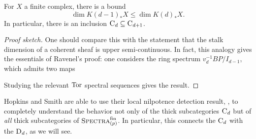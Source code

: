 \begin{lemma}\label{CdCategoriesNest}
For \(X\) a finite complex, there is a bound \[\dim K(d-1)_* X \le \dim K(d)_* X.\]  In particular, there is an inclusion \(\normalfont\textsc{C}_d \subseteq \normalfont\textsc{C}_{d+1}\).
\end{lemma}
\begin{proof}[Proof sketch]
One should compare this with the statement that the stalk dimension of a coherent sheaf is upper semi-continuous.  In fact, this analogy gives the essentials of Ravenel's proof: one considers the ring spectrum \(v_d^{-1} BP / I_{d-1}\), which admits two maps
\begin{center}
\end{center}
Studying the relevant \(\operatorname{Tor}\) spectral sequences gives the result.
\end{proof}

Hopkins and Smith are able to use their local nilpotence detection result, , to completely understand the behavior not only of the thick subcategories \(\normalfont\textsc{C}_d\) but of \emph{all} thick subcategories of \(\normalfont\textsc{Spectra}_{(p)}^{\mathrm{fin}}\).  In particular, this connects the \(\normalfont\textsc{C}_d\) with the \(\normalfont\textsc{D}_d\), as we will see.

